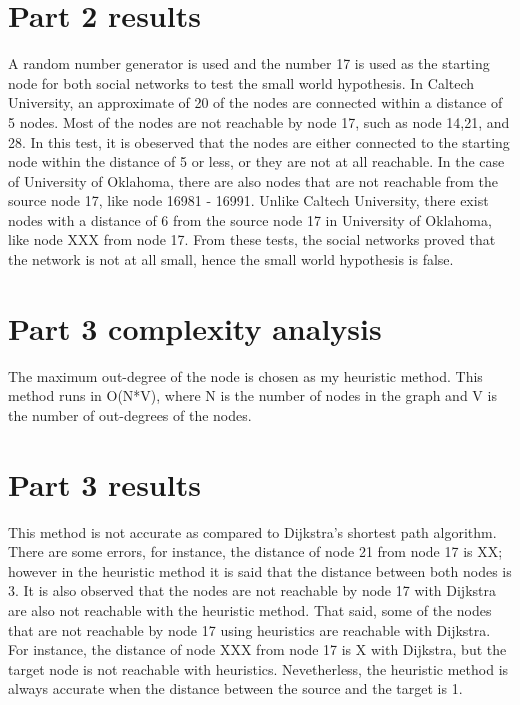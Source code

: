 \documentclass{article}
\begin{document}

\section{Part 2 results}
\label{sec:part2}
A random number generator is used and the number 17 is used as the starting node for both
social networks to test the small world hypothesis. In Caltech University, an approximate of 20%
of the nodes are connected within a distance of 5 nodes. Most of the nodes are not reachable by
node 17, such as node 14,21, and 28. In this test, it is obeserved that the nodes are either connected
to the starting node within the distance of 5 or less, or they are not at all reachable.
In the case of University of Oklahoma, there are also nodes that are not reachable from the source node 17,
like node 16981 - 16991. Unlike Caltech University, there exist nodes with a distance of 6 from the source 
node 17 in University of Oklahoma, like node XXX from node 17.
From these tests, the social networks proved that the network is not at all small, hence the small world
hypothesis is false. 


\section{Part 3 complexity analysis}
\label{sec:complexity3}
The maximum out-degree of the node is chosen as my heuristic method. This method runs in O(N*V), where
N is the number of nodes in the graph and V is the number of out-degrees of the nodes.

\section{Part 3 results}
\label{sec:part3}
This method is not accurate as compared to Dijkstra's shortest path algorithm. There are some errors,
for instance, the distance of node 21 from node 17 is XX; however in the heuristic method it is said that
the distance between both nodes is 3. It is also observed that the nodes are not reachable by node 17 with
Dijkstra are also not reachable with the heuristic method. That said, some of the nodes that are not reachable
by node 17 using heuristics are reachable with Dijkstra. For instance, the distance of node XXX from node 17 is X
with Dijkstra, but the target node is not reachable with heuristics. Nevetherless, the heuristic method is always
accurate when the distance between the source and the target is 1.
\end{document}
